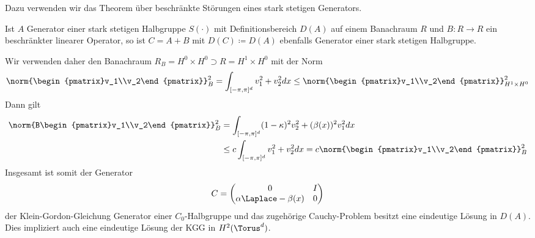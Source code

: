 Dazu verwenden wir das Theorem über beschränkte Störungen eines stark stetigen Generators.
\begin{maththeorem}
Ist $A$ Generator einer stark stetigen Halbgruppe $S(\cdot)$ mit Definitionsbereich $D(A)$ auf einem Banachraum $R$ und $B\colon R\to R$ ein beschränkter linearer Operator, so ist
$C=A+B$ mit $D(C)\coloneqq D(A)$ ebenfalls Generator einer stark stetigen Halbgruppe.
\end{maththeorem}
Wir verwenden daher den Banachraum $R_B=H^0\times H^0\supset R=H^1\times H^0$ mit der Norm 
\[\norm{\begin{pmatrix}v_1\\v_2\end{pmatrix}}_B^2=\int_{[-\pi,\pi]^d}v_1^2+v_2^2dx\le 
\norm{\begin{pmatrix}v_1\\v_2\end{pmatrix}}^2_{H^1\times H^0}\]
Dann gilt
\begin{align*}
\norm{B\begin{pmatrix}v_1\\v_2\end{pmatrix}}^2_B&=\int_{[-\pi,\pi]^d}(1-\kappa)^2v_2^2+(\beta(x))^2v_1^2dx\\
&\le c\int_{[-\pi,\pi]^d}v_1^2+v_2^2dx=c\norm{\begin{pmatrix}v_1\\v_2\end{pmatrix}}_B^2
\end{align*}
Insgesamt ist somit der Generator 
\[C=\begin{pmatrix}0 & I\\ \alpha\Laplace - \beta(x) & 0\end{pmatrix}\]
der Klein-Gordon-Gleichung Generator einer $C_0$-Halbgruppe und das zugehörige Cauchy-Problem besitzt eine eindeutige Lösung in $D(A)$. Dies impliziert auch eine eindeutige Lösung der KGG in $H^2(\Torus^d)$.
